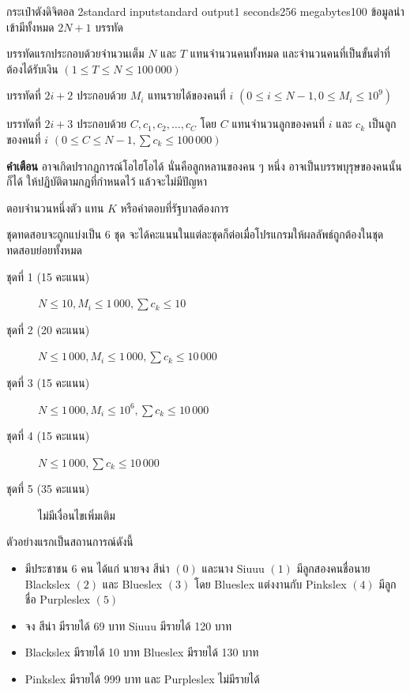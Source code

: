 \documentclass[11pt,a4paper]{article}
\begin{document}
\begin{problem}{กระเป๋าตังดิจิตอล 2}{standard input}{standard output}{1 seconds}{256 megabytes}{100}
\InputFile
ข้อมูลนำเข้ามีทั้งหมด $2N+1$ บรรทัด

บรรทัดแรกประกอบด้วยจำนวนเต็ม $N$ และ $T$ แทนจำนวนคนทั้งหมด และจำนวนคนที่เป็นขั้นต่ำที่ต้องได้รับเงิน $(1 \le T \le N \le 100\,000)$

บรรทัดที่ $2i+2$ ประกอบด้วย $M_i$ แทนรายได้ของคนที่ $i$ $(0 \le i \le N - 1, 0 \le M_i \le 10^9)$

บรรทัดที่ $2i+3$ ประกอบด้วย $C, c_1, c_2, \ldots, c_C$ โดย $C$ แทนจำนวนลูกของคนที่ $i$ และ $c_k$ เป็นลูกของคนที่ $i$ $(0 \le C \le N - 1, \sum{c_k} \le 100\,000)$

\textbf{คำเตือน} อาจเกิดปรากฏการณ์โอไฮโอได้ นั่นคือลูกหลานของคน ๆ หนึ่ง อาจเป็นบรรพบุรุษของคนนั้นก็ได้ ให้ปฏิบัติตามกฎที่กำหนดไว้ แล้วจะไม่มีปัญหา

\OutputFile
ตอบจำนวนหนึ่งตัว แทน $K$ หรือคำตอบที่รัฐบาลต้องการ

\Scoring
ชุดทดสอบจะถูกแบ่งเป็น 6 ชุด จะได้คะแนนในแต่ละชุดก็ต่อเมื่อโปรแกรมให้ผลลัพธ์ถูกต้องในชุดทดสอบย่อยทั้งหมด

\begin{description}

\item[ชุดที่ 1 (15 คะแนน)] $N \le 10, M_i \le 1\,000, \sum{c_k} \le 10$

\item[ชุดที่ 2 (20 คะแนน)] $N \le 1\,000, M_i \le 1\,000, \sum{c_k} \le 10\,000$

\item[ชุดที่ 3 (15 คะแนน)] $N \le 1\,000, M_i \le 10^6, \sum{c_k} \le 10\,000$

\item[ชุดที่ 4 (15 คะแนน)] $N \le 1\,000, \sum{c_k} \le 10\,000$

\item[ชุดที่ 5 (35 คะแนน)] ไม่มีเงื่อนไขเพิ่มเติม


\end{description}

\Examples

\begin{example}
%
%
\end{example}

\Note

ตัวอย่างแรกเป็นสถานการณ์ดังนี้

\begin{itemize}
    \item มีประชาชน 6 คน ได้แก่ นายจง สีน่า $(0)$ และนาง Siuuu $(1)$ มีลูกสองคนชื่อนาย Blackslex $(2)$ และ Blueslex $(3)$ โดย Blueslex แต่งงานกับ Pinkslex $(4)$ มีลูกชื่อ Purpleslex $(5)$
    \item จง สีน่า มีรายได้ 69 บาท Siuuu มีรายได้ 120 บาท
    \item Blackslex มีรายได้ 10 บาท Blueslex มีรายได้ 130 บาท
    \item Pinkslex มีรายได้ 999 บาท และ Purpleslex ไม่มีรายได้
\end{itemize}


\end{problem}
\end{document}
